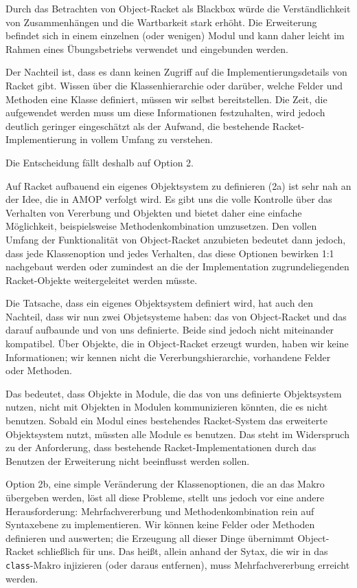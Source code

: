 Durch das Betrachten von Object-Racket als Blackbox würde die Verständlichkeit von Zusammenhängen und die Wartbarkeit stark erhöht. Die Erweiterung befindet sich in einem einzelnen (oder wenigen) Modul und kann daher leicht im Rahmen eines Übungsbetriebs verwendet und eingebunden werden.

Der Nachteil ist, dass es dann keinen Zugriff auf die Implementierungsdetails von Racket gibt. Wissen über die Klassenhierarchie oder darüber, welche Felder und Methoden eine Klasse definiert, müssen wir selbst bereitstellen. Die Zeit, die aufgewendet werden muss um diese Informationen festzuhalten, wird jedoch deutlich geringer eingeschätzt als der Aufwand, die bestehende Racket-Implementierung in vollem Umfang zu verstehen. 

Die Entscheidung fällt deshalb auf Option 2.

Auf Racket aufbauend ein eigenes Objektsystem zu definieren (2a) ist sehr nah an der Idee, die in AMOP verfolgt wird. Es gibt uns die volle Kontrolle über das Verhalten von Vererbung und Objekten und bietet daher eine einfache Möglichkeit, beispielsweise Methodenkombination umzusetzen. Den vollen Umfang der Funktionalität von Object-Racket anzubieten bedeutet dann jedoch, dass jede Klassenoption und jedes Verhalten, das diese Optionen bewirken 1:1 nachgebaut werden oder zumindest an die der Implementation zugrundeliegenden Racket-Objekte weitergeleitet werden müsste.

Die Tatsache, dass ein eigenes Objektsystem definiert wird, hat auch den Nachteil, dass wir nun zwei Objetsysteme haben: das von Object-Racket und das darauf aufbaunde und von uns definierte. Beide sind jedoch nicht miteinander kompatibel. Über Objekte, die in Object-Racket erzeugt wurden, haben wir keine Informationen; wir kennen nicht die Vererbungshierarchie, vorhandene Felder oder Methoden. 

Das bedeutet, dass Objekte in Module, die das von uns definierte Objektsystem nutzen, nicht mit Objekten in Modulen kommunizieren könnten, die es nicht benutzen. Sobald ein Modul eines bestehendes Racket-System das erweiterte Objektsystem nutzt, müssten alle Module es benutzen. Das steht im Widerspruch zu der Anforderung, dass bestehende Racket-Implementationen durch das Benutzen der Erweiterung nicht beeinflusst werden sollen.

Option 2b, eine simple Veränderung der Klassenoptionen, die an das Makro übergeben werden, löst all diese Probleme, stellt uns jedoch vor eine andere Herausforderung: Mehrfachvererbung und Methodenkombination rein auf Syntaxebene zu implementieren. Wir können keine Felder oder Methoden definieren und auswerten; die Erzeugung all dieser Dinge übernimmt Object-Racket schließlich für uns. Das heißt, allein anhand der Sytax, die wir in das \texttt{class}-Makro injizieren (oder daraus entfernen), muss Mehrfachvererbung erreicht werden.

